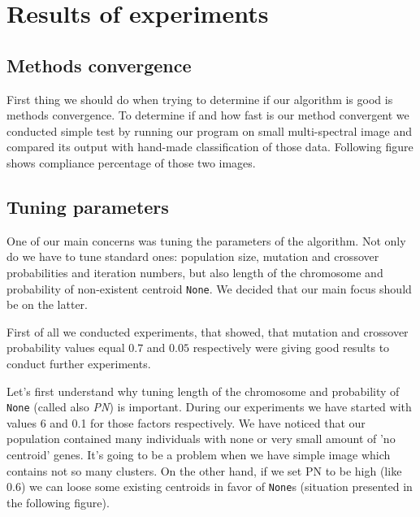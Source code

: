 \documentclass[11pt,leqno]{article}
\theoremstyle{mytheoremstyle}
\theoremstyle{mytheoremstyle}
\begin{document}
\section{Results of experiments}

\subsection{Methods convergence}

First thing we should do when trying to determine if our algorithm is good is methods convergence. To determine if and how fast is our method convergent we conducted simple test by running our program on small multi-spectral image and compared its output with hand-made classification of those data. Following figure shows compliance percentage of those two images.

\begin{center}
\begin{figure}

\end{figure}
\end{center}


\subsection{Tuning parameters}

One of our main concerns was tuning the parameters of the algorithm. Not only do we have to tune standard ones: population size, mutation and crossover probabilities and iteration numbers, but also length of the chromosome and probability of non-existent centroid \texttt{None}. We decided that our main focus should be on the latter.

First of all we conducted experiments, that showed, that mutation and crossover probability values equal $0.7$ and $0.05$ respectively were giving good results to conduct further experiments.

Let's first understand why tuning length of the chromosome and probability of \texttt{None} (called also \textit{PN}) is important. During our experiments we have started with values 6 and 0.1 for those factors respectively. We have noticed that our population contained many individuals with none or very small amount of 'no centroid' genes. It's going to be a problem when we have simple image which contains not so many clusters. On the other hand, if we set PN to be high (like 0.6) we can loose some existing centroids in favor of \texttt{None}s (situation presented in the following figure).
\end{document}
